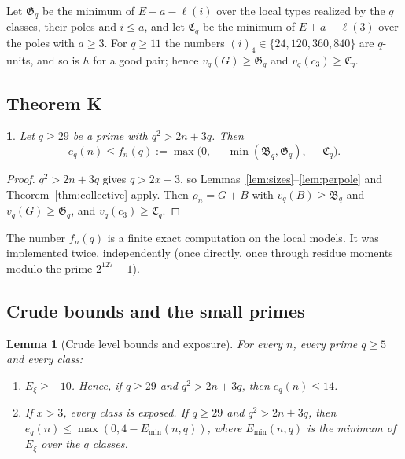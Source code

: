 \documentclass{amsart}
\newtheorem{lemma}[theorem]{Lemma}
\newcommand{\thisthmname}{}
\newtheorem*{genericthm}{\thisthmname}
\newenvironment{namedthm}[1]{\renewcommand{\thisthmname}{#1}\begin{genericthm}}{\end{genericthm}}
\theoremstyle{definition}
\theoremstyle{remark}
\numberwithin{equation}{section}
\begin{document}
Let $\mathfrak G_q$ be the minimum of $E+a-\ell(i)$ over the local types
realized by the $q$ classes, their poles and $i\le a$, and let $\mathfrak C_q$
be the minimum of $E+a-\ell(3)$ over the poles with $a\ge3$. For $q\ge11$ the
numbers $(i)_4\in\{24,120,360,840\}$ are $q$-units, and so is $h$ for a good
pair; hence $v_q(G)\ge\mathfrak G_q$ and $v_q(c_3)\ge\mathfrak C_q$.

\subsection{Theorem K}\label{ss:K}

\begin{namedthm}{Theorem K}
Let $q\ge29$ be a prime with $q^2>2n+3q$. Then
\[
  e_q(n)\le f_n(q):=\max\bigl(0,\,-\min(\mathfrak B_q,\mathfrak G_q),\,-\mathfrak C_q\bigr).
\]
\end{namedthm}

\begin{proof}
$q^2>2n+3q$ gives $q>2x+3$, so Lemmas~\ref{lem:sizes}--\ref{lem:perpole} and
Theorem~\ref{thm:collective} apply. Then $\rho_n=G+B$ with
$v_q(B)\ge\mathfrak B_q$ and $v_q(G)\ge\mathfrak G_q$, and
$v_q(c_3)\ge\mathfrak C_q$.
\end{proof}

The number $f_n(q)$ is a finite exact computation on the local models. It was
implemented twice, independently (once directly, once through residue moments
modulo the prime $2^{127}-1$).

\subsection{Crude bounds and the small primes}\label{ss:crude}

\begin{lemma}[Crude level bounds and exposure]\label{lem:crude}
For every $n$, every prime $q\ge5$ and every class:
\begin{enumerate}
\item[(1)] $E_\xi\ge-10$. Hence, if $q\ge29$ and $q^2>2n+3q$, then
  $e_q(n)\le14$.
\item[(2)] If $x>3$, every class is exposed. If $q\ge29$ and $q^2>2n+3q$,
  then $e_q(n)\le\max(0,4-E_{\min}(n,q))$, where $E_{\min}(n,q)$ is the
  minimum of $E_\xi$ over the $q$ classes.
\end{enumerate}
\end{lemma}
\end{document}
